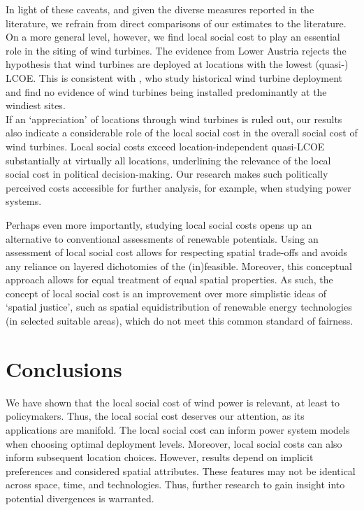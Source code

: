 \documentclass[review, a4paper, 12pt, authoryear, times]{elsarticle}
\begin{document}
In light of these caveats, and given the diverse measures reported in the literature, we refrain from direct comparisons of our estimates to the literature.
On a more general level, however, we find local social cost to play an essential role in the siting of wind turbines.
The evidence from Lower Austria rejects the hypothesis that wind turbines are deployed at locations with the lowest (quasi-) LCOE.
This is consistent with \cite{Hedenus2022}, who study historical wind turbine deployment and find no evidence of wind turbines being installed predominantly at the windiest sites.\\
If an `appreciation' of locations through wind turbines is ruled out, our results also indicate a considerable role of the local social cost in the overall social cost of wind turbines.
Local social costs exceed location-independent quasi-LCOE substantially at virtually all locations, underlining the relevance of the local social cost in political decision-making.
Our research makes such politically perceived costs accessible for further analysis, for example, when studying power systems.

Perhaps even more importantly, studying local social costs opens up an alternative to conventional assessments of renewable potentials.
Using an assessment of local social cost allows for respecting spatial trade-offs and avoids any reliance on layered dichotomies of the (in)feasible.
Moreover, this conceptual approach allows for equal treatment of equal spatial properties.
As such, the concept of local social cost is an improvement over more simplistic ideas of `spatial justice', such as spatial equidistribution of renewable energy technologies (in selected suitable areas), which do not meet this common standard of fairness.

\section{Conclusions}\label{sec:conclusio}
We have shown that the local social cost of wind power is relevant, at least to policymakers. 
Thus, the local social cost deserves our attention, as its applications are manifold.
The local social cost can inform power system models when choosing optimal deployment levels. 
Moreover, local social costs can also inform subsequent location choices. 
However, results depend on implicit preferences and considered spatial attributes. 
These features may not be identical across space, time, and technologies. 
Thus, further research to gain insight into potential divergences is warranted.
\end{document}
